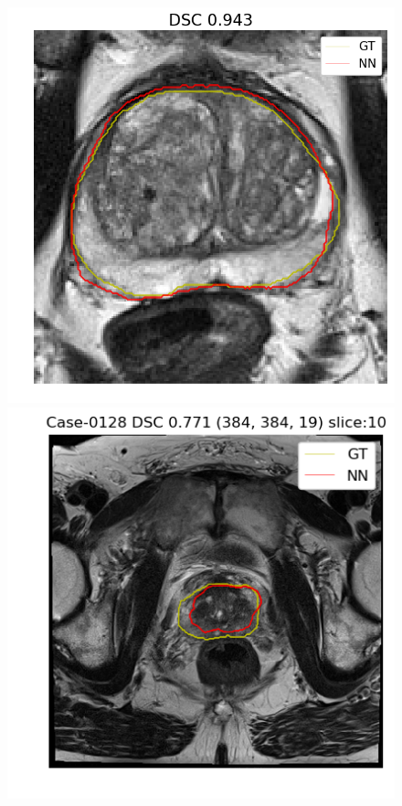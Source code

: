 \begin{figure}[h]
    \includegraphics[totalheight=.2\textheight]{figures/results/Prostate_Px_Challenge__P_yes_ROI_MAX_Case-0337.png}
    \vspace{10mm}
    \includegraphics[totalheight=.2\textheight]{figures/results/Prostate_Px_Challenge__P_yes_Original_MIN_Case-0128.png}

\end{figure}
